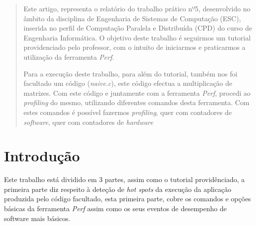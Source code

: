 \documentclass[conference,compsoc]{IEEEtran}
\begin{document}
\maketitle

\begin{abstract}
Este artigo, representa o relatório do trabalho prático nº5, desenvolvido no âmbito da disciplina de Engenharia de Sistemas de Computação (ESC), inserida no perfil de Computação Paralela e Distribuída (CPD) do curso de Engenharia Informática. O objetivo deste trabalho é seguirmos um tutorial\cite{tutorial} providenciado pelo professor, com o intuito de iniciarmos e praticarmos a utilização da ferramenta \textit{Perf}. 

Para a execução deste trabalho, para além do tutorial, também nos foi facultado um código (\textit{naive.c}), este código efectua a multiplicação de matrizes. Com este código e juntamente com a ferramenta \textit{Perf}, procedi ao \textit{profiling} do mesmo, utilizando diferentes comandos desta ferramenta. Com estes comandos é possível fazermos \textit{profiling}, quer com contadores de \textit{software}, quer com contadores de \textit{hardware} 

\end{abstract}





%
\IEEEpeerreviewmaketitle



\section{Introdução}

Este trabalho está dividido em 3 partes, assim como o tutorial providênciado, a primeira parte diz respeito à deteção de \textit{hot spots} da execução da aplicação produzida pelo código facultado, esta primeira parte, cobre os comandos e opções básicas da ferramenta \textit{Perf} assim como os seus eventos de desempenho de software mais básicos. 
\end{document}
